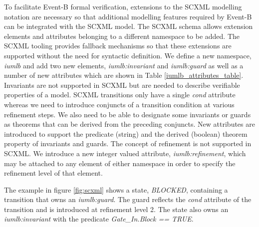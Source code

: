 To facilitate Event-B formal verification, extensions to the SCXML 
modelling notation are necessary so that additional modelling features 
required by Event-B can be integrated with the SCXML model.
The SCXML schema allows extension elements and attributes belonging 
to a different namespace to be added. 
The SCXML tooling provides fallback mechanisms so that these extensions are supported 
without the need for syntactic definition. We define a new namespace,  
\emph{iumlb} and add two new elements, \emph{iumlb:invariant} and 
\emph{iumlb:guard} as well as a 
number of new attributes which are shown in Table \ref{iumlb_attributes_table}.
Invariants are not supported in SCXML but are needed to describe 
verifiable properties of a model. 
SCXML transitions only have a single \emph{cond} attribute whereas we need to introduce conjuncts of a transition
condition at various refinement steps. 
We also need to be able to designate some 
invariants or guards as theorems that can be derived from the preceding conjuncts. 
New attributes are introduced to support the predicate (string) and the 
derived (boolean) theorem property of invariants and guards. The concept 
of refinement is not supported in SCXML. We introduce a new integer valued 
attribute, \emph{iumlb:refinement}, which may be attached to any element of 
either namespace in order to specify the refinement level of that element. 


The example in figure \ref{fig:scxml} shows a state, \emph{BLOCKED}, 
containing a transition that owns an \emph{iumlb:guard}.
The guard reflects the \emph{cond} attribute of the transition 
and is introduced at refinement level 2. 
The state also owns an \emph{iumlb:invariant} with the predicate
 \emph{Gate\_In.Block == TRUE}.





